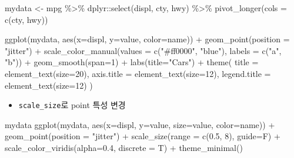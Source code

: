 \documentclass[
]{book}
\newenvironment{Shaded}{\begin{snugshade}}{\end{snugshade}}
\newcommand{\AttributeTok}[1]{\textcolor[rgb]{0.77,0.63,0.00}{#1}}
\newcommand{\DecValTok}[1]{\textcolor[rgb]{0.00,0.00,0.81}{#1}}
\newcommand{\FloatTok}[1]{\textcolor[rgb]{0.00,0.00,0.81}{#1}}
\newcommand{\FunctionTok}[1]{\textcolor[rgb]{0.00,0.00,0.00}{#1}}
\newcommand{\NormalTok}[1]{#1}
\newcommand{\OtherTok}[1]{\textcolor[rgb]{0.56,0.35,0.01}{#1}}
\newcommand{\SpecialCharTok}[1]{\textcolor[rgb]{0.00,0.00,0.00}{#1}}
\newcommand{\StringTok}[1]{\textcolor[rgb]{0.31,0.60,0.02}{#1}}
\providecommand{\tightlist}{%
  \setlength{\itemsep}{0pt}\setlength{\parskip}{0pt}}
\begin{document}
\begin{Shaded}
\begin{Highlighting}[]
\NormalTok{mydata }\OtherTok{\textless{}{-}}\NormalTok{ mpg }\SpecialCharTok{\%\textgreater{}\%} 
\NormalTok{  dplyr}\SpecialCharTok{::}\FunctionTok{select}\NormalTok{(displ, cty, hwy) }\SpecialCharTok{\%\textgreater{}\%} 
  \FunctionTok{pivot\_longer}\NormalTok{(}\AttributeTok{cols =} \FunctionTok{c}\NormalTok{(cty, hwy))}

\FunctionTok{ggplot}\NormalTok{(mydata, }\FunctionTok{aes}\NormalTok{(}\AttributeTok{x=}\NormalTok{displ, }\AttributeTok{y=}\NormalTok{value, }\AttributeTok{color=}\NormalTok{name)) }\SpecialCharTok{+}
  \FunctionTok{geom\_point}\NormalTok{(}\AttributeTok{position =} \StringTok{"jitter"}\NormalTok{) }\SpecialCharTok{+}
  \FunctionTok{scale\_color\_manual}\NormalTok{(}\AttributeTok{values =} \FunctionTok{c}\NormalTok{(}\StringTok{"\#ff0000"}\NormalTok{, }\StringTok{"blue"}\NormalTok{), }
                     \AttributeTok{labels =} \FunctionTok{c}\NormalTok{(}\StringTok{"a"}\NormalTok{, }\StringTok{"b"}\NormalTok{)) }\SpecialCharTok{+}
  \FunctionTok{geom\_smooth}\NormalTok{(}\AttributeTok{span=}\DecValTok{1}\NormalTok{) }\SpecialCharTok{+}
  \FunctionTok{labs}\NormalTok{(}\AttributeTok{title=}\StringTok{"Cars"}\NormalTok{) }\SpecialCharTok{+}
  \FunctionTok{theme}\NormalTok{(}
    \AttributeTok{title =} \FunctionTok{element\_text}\NormalTok{(}\AttributeTok{size=}\DecValTok{20}\NormalTok{),}
    \AttributeTok{axis.title =} \FunctionTok{element\_text}\NormalTok{(}\AttributeTok{size=}\DecValTok{12}\NormalTok{),}
    \AttributeTok{legend.title =} \FunctionTok{element\_text}\NormalTok{(}\AttributeTok{size=}\DecValTok{12}\NormalTok{)}
\NormalTok{  )}
  
\end{Highlighting}
\end{Shaded}

\begin{itemize}
\tightlist
\item
  \texttt{scale\_size}로 point 특성 변경
\end{itemize}

\begin{Shaded}
\begin{Highlighting}[]
\NormalTok{mydata}
\FunctionTok{ggplot}\NormalTok{(mydata, }\FunctionTok{aes}\NormalTok{(}\AttributeTok{x=}\NormalTok{displ, }\AttributeTok{y=}\NormalTok{value, }\AttributeTok{size=}\NormalTok{value, }\AttributeTok{color=}\NormalTok{name)) }\SpecialCharTok{+}
  \FunctionTok{geom\_point}\NormalTok{(}\AttributeTok{position =} \StringTok{"jitter"}\NormalTok{) }\SpecialCharTok{+}
  \FunctionTok{scale\_size}\NormalTok{(}\AttributeTok{range =} \FunctionTok{c}\NormalTok{(}\FloatTok{0.5}\NormalTok{, }\DecValTok{8}\NormalTok{), }\AttributeTok{guide=}\NormalTok{F) }\SpecialCharTok{+}
  \FunctionTok{scale\_color\_viridis}\NormalTok{(}\AttributeTok{alpha=}\FloatTok{0.4}\NormalTok{, }\AttributeTok{discrete =}\NormalTok{ T) }\SpecialCharTok{+}
  \FunctionTok{theme\_minimal}\NormalTok{()}
\end{Highlighting}
\end{Shaded}
\end{document}
